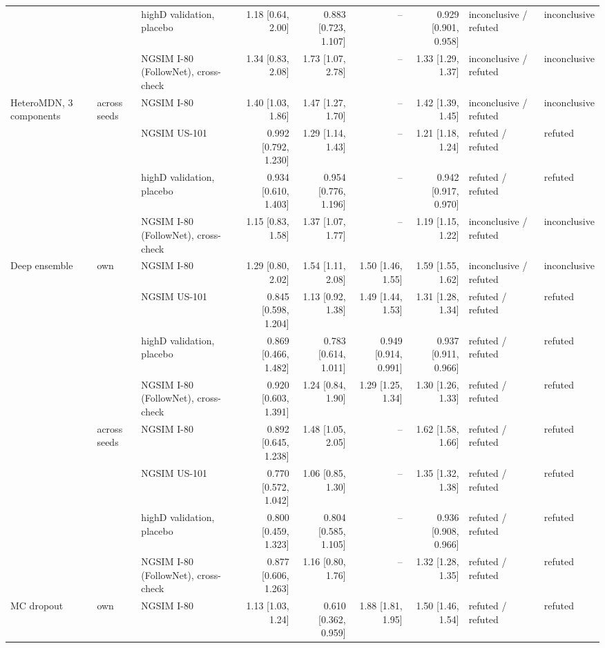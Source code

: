 \begin{longtable}{lllrrrrll}
 &  & highD validation, placebo & 1.18 [0.64, 2.00] & 0.883 [0.723, 1.107] & -- & 0.929 [0.901, 0.958] & inconclusive / refuted & inconclusive \\
 &  & NGSIM I-80 (FollowNet), cross-check & 1.34 [0.83, 2.08] & 1.73 [1.07, 2.78] & -- & 1.33 [1.29, 1.37] & inconclusive / refuted & inconclusive \\
\midrule
HeteroMDN, 3 components & across seeds & NGSIM I-80 & 1.40 [1.03, 1.86] & 1.47 [1.27, 1.70] & -- & 1.42 [1.39, 1.45] & inconclusive / refuted & inconclusive \\
 &  & NGSIM US-101 & 0.992 [0.792, 1.230] & 1.29 [1.14, 1.43] & -- & 1.21 [1.18, 1.24] & refuted / refuted & refuted \\
 &  & highD validation, placebo & 0.934 [0.610, 1.403] & 0.954 [0.776, 1.196] & -- & 0.942 [0.917, 0.970] & refuted / refuted & refuted \\
 &  & NGSIM I-80 (FollowNet), cross-check & 1.15 [0.83, 1.58] & 1.37 [1.07, 1.77] & -- & 1.19 [1.15, 1.22] & inconclusive / refuted & inconclusive \\
\midrule
Deep ensemble & own & NGSIM I-80 & 1.29 [0.80, 2.02] & 1.54 [1.11, 2.08] & 1.50 [1.46, 1.55] & 1.59 [1.55, 1.62] & inconclusive / refuted & inconclusive \\
 &  & NGSIM US-101 & 0.845 [0.598, 1.204] & 1.13 [0.92, 1.38] & 1.49 [1.44, 1.53] & 1.31 [1.28, 1.34] & refuted / refuted & refuted \\
 &  & highD validation, placebo & 0.869 [0.466, 1.482] & 0.783 [0.614, 1.011] & 0.949 [0.914, 0.991] & 0.937 [0.911, 0.966] & refuted / refuted & refuted \\
 &  & NGSIM I-80 (FollowNet), cross-check & 0.920 [0.603, 1.391] & 1.24 [0.84, 1.90] & 1.29 [1.25, 1.34] & 1.30 [1.26, 1.33] & refuted / refuted & refuted \\
\midrule
 & across seeds & NGSIM I-80 & 0.892 [0.645, 1.238] & 1.48 [1.05, 2.05] & -- & 1.62 [1.58, 1.66] & refuted / refuted & refuted \\
 &  & NGSIM US-101 & 0.770 [0.572, 1.042] & 1.06 [0.85, 1.30] & -- & 1.35 [1.32, 1.38] & refuted / refuted & refuted \\
 &  & highD validation, placebo & 0.800 [0.459, 1.323] & 0.804 [0.585, 1.105] & -- & 0.936 [0.908, 0.966] & refuted / refuted & refuted \\
 &  & NGSIM I-80 (FollowNet), cross-check & 0.877 [0.606, 1.263] & 1.16 [0.80, 1.76] & -- & 1.32 [1.28, 1.35] & refuted / refuted & refuted \\
\midrule
MC dropout & own & NGSIM I-80 & 1.13 [1.03, 1.24] & 0.610 [0.362, 0.959] & 1.88 [1.81, 1.95] & 1.50 [1.46, 1.54] & refuted / refuted & refuted \\

\end{longtable}
